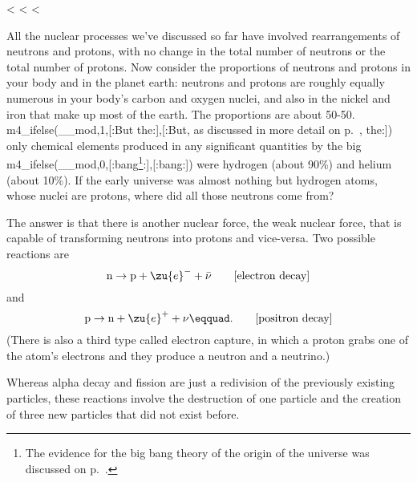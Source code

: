     <%
  <%
  <%

        All the nuclear processes we've discussed so far have
        involved rearrangements of neutrons and protons, with no
        change in the total number of neutrons or the total number
        of protons. Now consider the proportions of neutrons and
        protons in your body and in the planet earth: neutrons and
        protons are roughly equally numerous in your body's carbon
        and oxygen nuclei, and also in the nickel and iron that make
        up most of the earth. The proportions are about 50-50. 
        m4_ifelse(__mod,1,[:But the:],[:But, as discussed in more
        detail on p.~\pageref{subsec:nucleosynthesis}, the:])
        only chemical elements produced in any significant
        quantities by the big m4_ifelse(__mod,0,[:bang\footnote{The evidence for
        the big bang theory of the origin of the universe was discussed
        on p.~\pageref{bigbang}.}:],[:bang:]) were hydrogen (about 90\%) and
        helium (about 10\%). If the early universe was almost
        nothing but hydrogen atoms, whose nuclei are protons, where
        did all those neutrons come from?

        The answer is that there is another nuclear force, the weak
        nuclear force, that is capable of transforming neutrons into
        protons and vice-versa. Two possible reactions are
        \begin{equation*}
                \text{n} \rightarrow \text{p} + \zu{e}^- +  \bar{\nu}\qquad        \hfill        \text{[electron decay]}
        \end{equation*}
        and
        \begin{equation*}
                \text{p} \rightarrow \text{n} + \zu{e}^+ + \nu\eqquad.
                                                \qquad \hfill        \text{[positron decay]}        
        \end{equation*}
        (There is also a third type called electron capture, in
        which a proton grabs one of the atom's electrons and they
        produce a neutron and a neutrino.)\label{electroncapture}

        Whereas alpha decay and fission are just a redivision of the
        previously existing particles, these reactions involve the
        destruction of one particle and the creation of three new
        particles that did not exist before.

